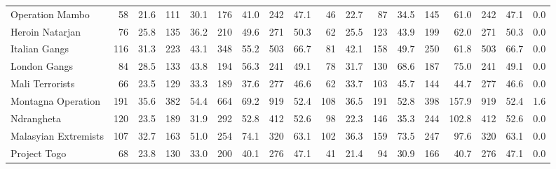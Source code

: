 \begin{tabular}{lrrrrrrrrrrrrrrrrl}
Operation Mambo      &                58 &  21.6 &  111 &  30.1 &  176 &  41.0 &  242 &  47.1 &               46 &   22.7 &   87 &   34.5 &  145 &   61.0 &  242 &  47.1 &        0.0 \\
Heroin Natarjan      &                76 &  25.8 &  135 &  36.2 &  210 &  49.6 &  271 &  50.3 &               62 &   25.5 &  123 &   43.9 &  199 &   62.0 &  271 &  50.3 &        0.0 \\
Italian Gangs        &               116 &  31.3 &  223 &  43.1 &  348 &  55.2 &  503 &  66.7 &               81 &   42.1 &  158 &   49.7 &  250 &   61.8 &  503 &  66.7 &        0.0 \\
London Gangs         &                84 &  28.5 &  133 &  43.8 &  194 &  56.3 &  241 &  49.1 &               78 &   31.7 &  130 &   68.6 &  187 &   75.0 &  241 &  49.1 &        0.0 \\
Mali Terrorists      &                66 &  23.5 &  129 &  33.3 &  189 &  37.6 &  277 &  46.6 &               62 &   33.7 &  103 &   45.7 &  144 &   44.7 &  277 &  46.6 &        0.0 \\
Montagna Operation   &               191 &  35.6 &  382 &  54.4 &  664 &  69.2 &  919 &  52.4 &              108 &   36.5 &  191 &   52.8 &  398 &  157.9 &  919 &  52.4 &        1.6 \\
Ndrangheta           &               120 &  23.5 &  189 &  31.9 &  292 &  52.8 &  412 &  52.6 &               98 &   22.3 &  146 &   35.3 &  244 &  102.8 &  412 &  52.6 &        0.0 \\
Malasyian Extremists &               107 &  32.7 &  163 &  51.0 &  254 &  74.1 &  320 &  63.1 &              102 &   36.3 &  159 &   73.5 &  247 &   97.6 &  320 &  63.1 &        0.0 \\
Project Togo         &                68 &  23.8 &  130 &  33.0 &  200 &  40.1 &  276 &  47.1 &               41 &   21.4 &   94 &   30.9 &  166 &   40.7 &  276 &  47.1 &        0.0 \\
\bottomrule
\end{tabular}
